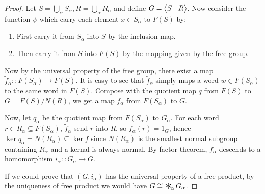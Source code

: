 \documentclass[a4paper,titlepage]{article}
\theoremstyle{remark}
\theoremstyle{definition}
\theoremstyle{theorem}
\DeclareMathOperator*{\freeprod}{\raisebox{-0.4ex}{\scalebox{2}{$\ast$}}\!}
\begin{document}
  \begin{proof}
    Let $S = \bigcup_\alpha S_\alpha, R = \bigcup_\alpha R_\alpha$ and define 
    $G = \big\langle S \bigm| R \big\rangle$. Now consider the function $\psi$ which
    carry each element $x \in S_\alpha$ to $F(S)$ by:
    \begin{enumerate}
      \item First carry it from $S_\alpha$ into $S$ by the inclusion map.
      \item Then carry it from $S$ into $F(S)$ by the mapping given by the free group.
    \end{enumerate}
    Now by the universal property of the free group, there exist a map 
    $\tilde{f}_\alpha :: F(S_\alpha) \to F(S)$. It is easy to see that $\tilde{f}_\alpha$
    simply maps a word $w \in F(S_\alpha)$ to the same word in $F(S)$.
    Compose with the quotient map $q$ from $F(S)$ to $G = F(S) / N(R)$, we get a map $f_\alpha$ from
    $F(S_\alpha)$ to $G$. 

    Now, let $q_\alpha$ be the quotient map from $F(S_\alpha)$ to $G_\alpha$.
    For each word $r \in R_\alpha \subseteq F(S_\alpha)$, $\tilde{f}_\alpha$ send $r$ into $R$,
    so $f_\alpha(r) = 1_G$, hence $\ker q_\alpha = N(R_\alpha) \subseteq \ker f$ since $N(R_\alpha)$ is the smallest
    normal subgroup containing $R_\alpha$ and a kernal is always normal. By factor theorem, $f_\alpha$
    descends to a homomorphism $i_\alpha :: G_\alpha \to G$.

    If we could prove that $(G, i_\alpha)$ has the universal property of a free product, by the uniqueness
    of free product we would have $G \cong \freeprod_\alpha G_\alpha$.


\end{proof}
\end{document}
